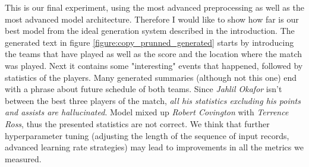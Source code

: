 \begin{table}[h]
    \centering
    \caption{Performance metrics on the Content Selection and Planning model.} \label{table:metrics_prunned}
\end{table}

This is our final experiment, using the most advanced preprocessing as well as the most advanced model architecture. Therefore I would like to show how far is our best model from the ideal generation system described in the introduction. The generated text in figure \ref{figure:copy_prunned_generated} starts by introducing the teams that have played as well as the score and the location where the match was played. Next it contains some "interesting" events that happened, followed by statistics of the players. Many generated summaries (although not this one) end with a phrase about future schedule of both teams. Since \emph{Jahlil Okafor} isn't between the best three players of the match, \emph{all his statistics excluding his points and assists are hallucinated}. Model mixed up \emph{Robert Covington} with \emph{Terrence Ross}, thus the presented statistics are not correct. We think that further hyperparameter tuning (adjusting the length of the sequence of input records, advanced learning rate strategies) may lead to improvements in all the metrics we measured.

